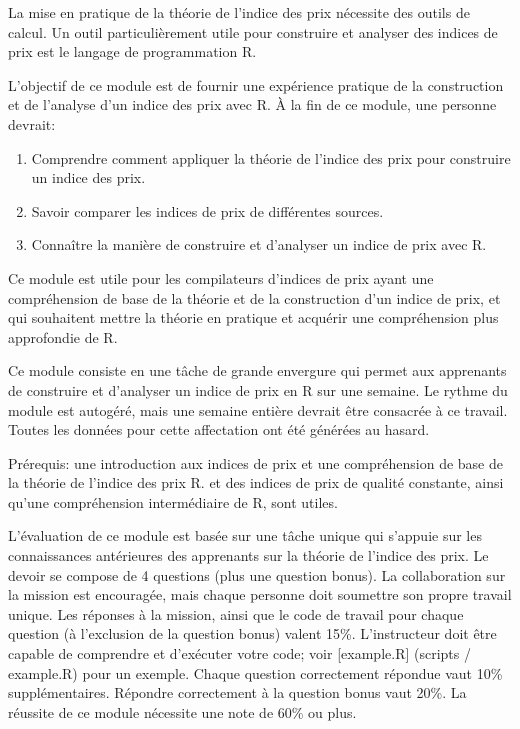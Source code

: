 \documentclass[]{article}
\providecommand{\tightlist}{%
  \setlength{\itemsep}{0pt}\setlength{\parskip}{0pt}}
\begin{document}
La mise en pratique de la théorie de l'indice des prix nécessite des outils de calcul. Un outil particulièrement utile pour construire et analyser des indices de prix est le langage de programmation R.

L'objectif de ce module est de fournir une expérience pratique de la construction et de l'analyse d'un indice des prix avec R. À la fin de ce module, une personne devrait:

\begin{enumerate}
\def\labelenumi{\arabic{enumi}.}
\tightlist
\item
  Comprendre comment appliquer la théorie de l'indice des prix pour construire un indice des prix.
\item
  Savoir comparer les indices de prix de différentes sources.
\item
  Connaître la manière de construire et d'analyser un indice de prix avec R.
\end{enumerate}

Ce module est utile pour les compilateurs d'indices de prix ayant une compréhension de base de la théorie et de la construction d'un indice de prix, et qui souhaitent mettre la théorie en pratique et acquérir une compréhension plus approfondie de R.

Ce module consiste en une tâche de grande envergure qui permet aux apprenants de construire et d'analyser un indice de prix en R sur une semaine. Le rythme du module est autogéré, mais une semaine entière devrait être consacrée à ce travail. Toutes les données pour cette affectation ont été générées au hasard.

Prérequis: une introduction aux indices de prix et une compréhension de base de la théorie de l'indice des prix R. et des indices de prix de qualité constante, ainsi qu'une compréhension intermédiaire de R, sont utiles.

L'évaluation de ce module est basée sur une tâche unique qui s'appuie sur les connaissances antérieures des apprenants sur la théorie de l'indice des prix. Le devoir se compose de 4 questions (plus une question bonus). La collaboration sur la mission est encouragée, mais chaque personne doit soumettre son propre travail unique. Les réponses à la mission, ainsi que le code de travail pour chaque question (à l'exclusion de la question bonus) valent 15\%. L'instructeur doit être capable de comprendre et d'exécuter votre code; voir {[}example.R{]} (scripts / example.R) pour un exemple. Chaque question correctement répondue vaut 10\% supplémentaires. Répondre correctement à la question bonus vaut 20\%. La réussite de ce module nécessite une note de 60\% ou plus.
\end{document}
